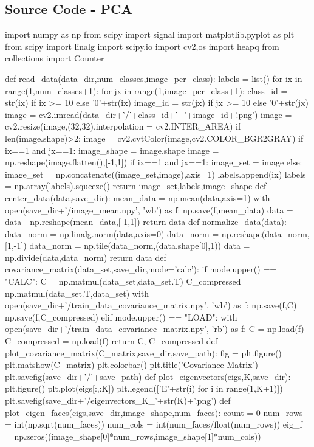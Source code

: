 \documentclass{article}
\begin{document}
\subsection{Source Code - PCA}
\begin{python}
import numpy as np
from scipy import signal
import matplotlib.pyplot as plt
from scipy import linalg
import scipy.io
import cv2,os
import heapq
from collections import Counter

def read_data(data_dir,num_classes,image_per_class):
	labels = list()
	for ix in range(1,num_classes+1):
		for jx in range(1,image_per_class+1):
			class_id = str(ix) if ix >= 10 else '0'+str(ix)
			image_id = str(jx) if jx >= 10 else '0'+str(jx)
			image = cv2.imread(data_dir+'/'+class_id+'_'+image_id+'.png')
			image = cv2.resize(image,(32,32),interpolation = cv2.INTER_AREA)
			if len(image.shape)>2:
				image = cv2.cvtColor(image,cv2.COLOR_BGR2GRAY)
			if ix==1 and jx==1:
				image_shape = image.shape
			image = np.reshape(image.flatten(),[-1,1])
			if ix==1 and jx==1:
				image_set = image
			else:
				image_set = np.concatenate((image_set,image),axis=1)
			labels.append(ix)
	labels = np.array(labels).squeeze()
	return image_set,labels,image_shape
def center_data(data,save_dir):
	mean_data = np.mean(data,axis=1)
	with open(save_dir+'/image_mean.npy', 'wb') as f:
		np.save(f,mean_data)
	data = data - np.reshape(mean_data,[-1,1])
	return data
def normalize_data(data):
	data_norm = np.linalg.norm(data,axis=0)
	data_norm = np.reshape(data_norm,[1,-1])
	data_norm = np.tile(data_norm,(data.shape[0],1))
	data = np.divide(data,data_norm)
	return data
def covariance_matrix(data_set,save_dir,mode='calc'):
	if mode.upper() == "CALC":
		C = np.matmul(data_set,data_set.T)
		C_compressed = np.matmul(data_set.T,data_set)
		with open(save_dir+'/train_data_covariance_matrix.npy', 'wb') as f:
			np.save(f,C)
			np.save(f,C_compressed)
	elif mode.upper() == "LOAD":
		with open(save_dir+'/train_data_covariance_matrix.npy', 'rb') as f:
			C = np.load(f)
			C_compressed = np.load(f)
	return C, C_compressed
def plot_covariance_matrix(C_matrix,save_dir,save_path):
	fig = plt.figure()
	plt.matshow(C_matrix)
	plt.colorbar()
	plt.title('Covariance Matrix')
	plt.savefig(save_dir+'/'+save_path)
def plot_eigenvectors(eigs,K,save_dir):
	plt.figure()
	plt.plot(eigs[:,:K])
	plt.legend(['E'+str(i) for i in range(1,K+1)])
	plt.savefig(save_dir+'/eigenvectors_K_'+str(K)+'.png')
def plot_eigen_faces(eigs,save_dir,image_shape,num_faces):
	count = 0
	num_rows = int(np.sqrt(num_faces))
	num_cols = int(num_faces/float(num_rows))
	eig_f = np.zeros((image_shape[0]*num_rows,image_shape[1]*num_cols))

\end{python}
\end{document}
